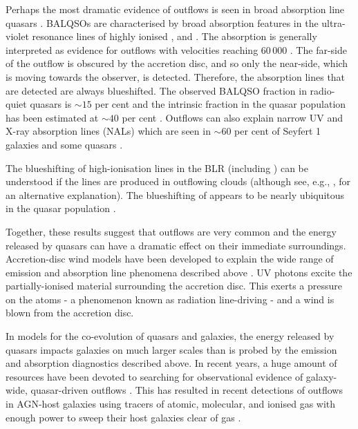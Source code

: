 Perhaps the most dramatic evidence of outflows is seen in broad absorption line quasars \citep[BALQSOs;][]{weymann91}.
BALQSOs are characterised by broad absorption features in the ultra-violet resonance lines of highly ionised ,  and . 
The absorption is generally interpreted as evidence for outflows with velocities reaching $60\,000$ \kms \citep[e.g.][]{turnshek88}.
The far-side of the outflow is obscured by the accretion disc, and so only the near-side, which is moving towards the observer, is detected. 
Therefore, the absorption lines that are detected are always blueshifted. 
The observed  BALQSO fraction in radio-quiet quasars is $\sim15$ per cent \citep[e.g.][]{hewett03,reichard03} and the intrinsic fraction in the quasar population has been estimated at $\sim40$ per cent \citep{allen11}.
Outflows can also explain narrow UV and X-ray absorption lines (NALs) which are seen in $\sim60$ per cent of Seyfert 1 galaxies \citep{crenshaw99}  and some quasars \citep[e.g.][]{hamann97}. 

The blueshifting of high-ionisation lines in the BLR (including ) can be understood if the lines are produced in outflowing clouds (although see, e.g., \citealt{gaskell16}, for an alternative explanation). 
The blueshifting of  appears to be nearly ubiquitous in the quasar population \citep[e.g.][]{richards02,richards11}. 

Together, these results suggest that outflows are very common and the energy released by quasars can have a dramatic effect on their immediate surroundings. 
Accretion-disc wind models have been developed to explain the wide range of emission and absorption line phenomena described above \citep[e.g.][]{murray95,elvis00,proga00,everett05}.
UV photons excite the partially-ionised material surrounding the accretion disc. 
This exerts a pressure on the atoms - a phenomenon known as radiation line-driving - and a wind is blown from the accretion disc. 
  
In models for the co-evolution of quasars and galaxies, the energy released by quasars impacts galaxies on much larger scales than is probed by the emission and absorption diagnostics described above.  
In recent years, a huge amount of resources have been devoted to searching for observational evidence of galaxy-wide, quasar-driven outflows \citep[for recent reviews, see][]{alexander12,fabian12,heckman14}.
This has resulted in recent detections of outflows in AGN-host galaxies using tracers of atomic, molecular, and ionised gas with enough power to sweep their host galaxies clear of gas \citep[e.g.][]{nesvadba06,arav08,nesvadba08,moe09,dunn10,alexander10,harrison12,harrison14,nesvadba10,rupke13,veilleux13,nardini15,feruglio10,alatalo11,cimatti13,cicone14}.  

